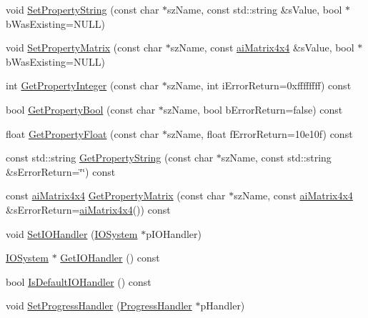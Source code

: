 \begin{DoxyCompactItemize}
\item 
void \hyperlink{class_assimp_1_1_importer_aa7baa373268404c1d5d1f7a5734dfa2b}{Set\+Property\+String} (const char $\ast$sz\+Name, const std\+::string \&s\+Value, bool $\ast$b\+Was\+Existing=N\+U\+L\+L)
\item 
void \hyperlink{class_assimp_1_1_importer_adaa479196bc4919ced9852025908b5d0}{Set\+Property\+Matrix} (const char $\ast$sz\+Name, const \hyperlink{structai_matrix4x4}{ai\+Matrix4x4} \&s\+Value, bool $\ast$b\+Was\+Existing=N\+U\+L\+L)
\item 
int \hyperlink{class_assimp_1_1_importer_afc34fe518a98c945ab8c29728cd8e5b8}{Get\+Property\+Integer} (const char $\ast$sz\+Name, int i\+Error\+Return=0xffffffff) const 
\item 
bool \hyperlink{class_assimp_1_1_importer_a90f5d35d25e5d2a0ef8bc0c6545b2010}{Get\+Property\+Bool} (const char $\ast$sz\+Name, bool b\+Error\+Return=false) const 
\item 
float \hyperlink{class_assimp_1_1_importer_a3bbf20b595f8d1a63dc12f4ad9cb29e0}{Get\+Property\+Float} (const char $\ast$sz\+Name, float f\+Error\+Return=10e10f) const 
\item 
const std\+::string \hyperlink{class_assimp_1_1_importer_aca134d367c7f7383c57776bf83c36bb0}{Get\+Property\+String} (const char $\ast$sz\+Name, const std\+::string \&s\+Error\+Return=\char`\"{}\char`\"{}) const 
\item 
const \hyperlink{structai_matrix4x4}{ai\+Matrix4x4} \hyperlink{class_assimp_1_1_importer_ac0f5e67a989356124b7041cb71b003c1}{Get\+Property\+Matrix} (const char $\ast$sz\+Name, const \hyperlink{structai_matrix4x4}{ai\+Matrix4x4} \&s\+Error\+Return=\hyperlink{structai_matrix4x4}{ai\+Matrix4x4}()) const 
\item 
void \hyperlink{class_assimp_1_1_importer_ac1c92d84d21c35dea6e5ad96a976c2ca}{Set\+I\+O\+Handler} (\hyperlink{class_assimp_1_1_i_o_system}{I\+O\+System} $\ast$p\+I\+O\+Handler)
\item 
\hyperlink{class_assimp_1_1_i_o_system}{I\+O\+System} $\ast$ \hyperlink{class_assimp_1_1_importer_a004d7e2c17e7dec53749051b0b596bd6}{Get\+I\+O\+Handler} () const 
\item 
bool \hyperlink{class_assimp_1_1_importer_a23ab79249a9c7e5e5048b04fc2f1c1c1}{Is\+Default\+I\+O\+Handler} () const 
\item 
void \hyperlink{class_assimp_1_1_importer_a0e7b34574f171c16fc9a6576a2fa3ce0}{Set\+Progress\+Handler} (\hyperlink{class_assimp_1_1_progress_handler}{Progress\+Handler} $\ast$p\+Handler)
\item 

\end{DoxyCompactItemize}
